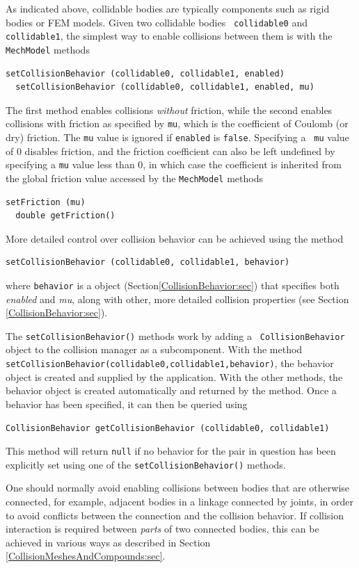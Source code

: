 As indicated above, collidable bodies are typically components such as
rigid bodies or FEM models. Given two collidable bodies {\tt
collidable0} and {\tt collidable1}, the simplest way to enable
collisions between them is with the {\tt MechModel} methods
%
\begin{lstlisting}[]
  setCollisionBehavior (collidable0, collidable1, enabled)
  setCollisionBehavior (collidable0, collidable1, enabled, mu)
\end{lstlisting}
%
The first method enables collisions {\it without} friction, while the
second enables collisions with friction as specified by {\tt mu},
which is the coefficient of Coulomb (or dry) friction.  The {\tt mu}
value is ignored if {\tt enabled} is {\tt false}. Specifying a {\tt
mu} value of 0 disables friction, and the friction coefficient can
also be left undefined by specifying a {\tt mu} value less than 0, in
which case the coefficient is inherited from the global friction value
accessed by the {\tt MechModel} methods
%
\begin{lstlisting}[]
  setFriction (mu)
  double getFriction()
\end{lstlisting}
%
More detailed control over collision behavior can be achieved
using the method
%
\begin{lstlisting}[]
  setCollisionBehavior (collidable0, collidable1, behavior)
\end{lstlisting}
%
where {\tt behavior} is a
 object
(Section\ref{CollisionBehavior:sec}) that specifies both {\it enabled}
and {\it mu}, along with other, more detailed collision properties
(see Section \ref{CollisionBehavior:sec}).

The {\tt setCollisionBehavior()} methods work by adding a {\tt
CollisionBehavior} object to the collision manager as a
subcomponent. With the method {\tt
setCollisionBehavior(collidable0,collidable1,behavior)}, the behavior
object is created and supplied by the application.  With the other
methods, the behavior object is created automatically and returned by
the method. Once a behavior has been specified, it can then be queried
using
%
\begin{lstlisting}[]
  CollisionBehavior getCollisionBehavior (collidable0, collidable1)
\end{lstlisting}
%
This method will return {\tt null} if no behavior for the pair in
question has been explicitly set using one of the
\pdfbreak
{\tt setCollisionBehavior()} methods.

\begin{sideblock}
One should normally avoid enabling collisions between bodies that are
otherwise connected, for example, adjacent bodies in a linkage
connected by joints, in order to avoid conflicts between
the connection and the collision behavior. If collision interaction is
required between {\it parts} of two connected bodies, this can be
achieved in various ways as described in Section
\ref{CollisionMeshesAndCompounds:sec}.
\end{sideblock}

